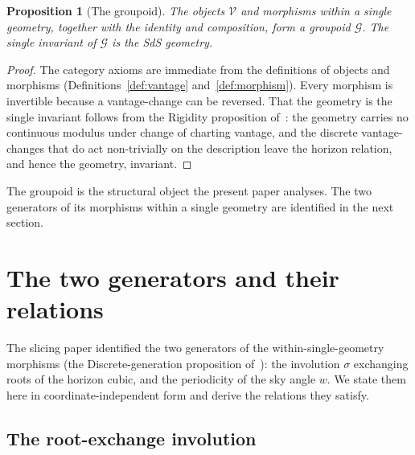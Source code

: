 \documentclass[11pt,a4paper]{article}
\newtheorem{proposition}[theorem]{Proposition}
\theoremstyle{definition}
\begin{document}
\begin{proposition}[The groupoid]\label{prop:groupoid}
The objects $\mathcal{V}$ and morphisms within a single geometry, together with the identity and composition, form a groupoid $\mathcal{G}$. The single invariant of $\mathcal{G}$ is the SdS geometry.
\end{proposition}

\begin{proof}
The category axioms are immediate from the definitions of objects and morphisms (Definitions~\ref{def:vantage} and~\ref{def:morphism}). Every morphism is invertible because a vantage-change can be reversed. That the geometry is the single invariant follows from the Rigidity proposition of~\cite{JanzenSlicing}: the geometry carries no continuous modulus under change of charting vantage, and the discrete vantage-changes that do act non-trivially on the description leave the horizon relation, and hence the geometry, invariant.
\end{proof}

The groupoid is the structural object the present paper analyses. The two generators of its morphisms within a single geometry are identified in the next section.

\section{The two generators and their relations}\label{sec:generators}

The slicing paper identified the two generators of the within-single-geometry morphisms (the Discrete-generation proposition of~\cite{JanzenSlicing}): the involution $\sigma$ exchanging roots of the horizon cubic, and the periodicity of the sky angle $w$. We state them here in coordinate-independent form and derive the relations they satisfy.

\subsection{The root-exchange involution}\label{sec:involution}
\end{document}
